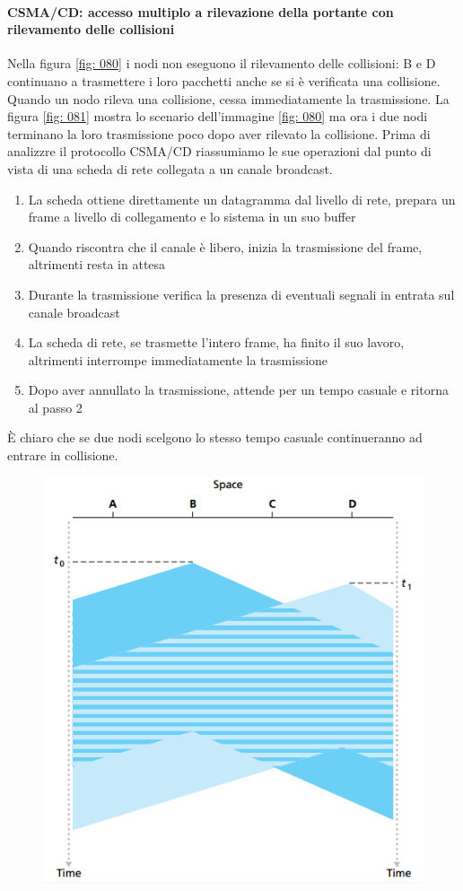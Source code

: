 \documentclass[11pt,a4paper]{article}
\begin{document}
{\paragraph{CSMA/CD: accesso multiplo a rilevazione della portante con rilevamento delle collisioni} \label{par: CSMA/CD}
Nella figura \ref{fig: 080} i nodi non eseguono il rilevamento delle collisioni: B e D continuano a trasmettere i loro pacchetti anche se si è verificata una collisione. Quando un nodo rileva una collisione, cessa immediatamente la trasmissione. La figura \ref{fig: 081} mostra lo scenario dell'immagine \ref{fig: 080} ma ora i due nodi terminano la loro trasmissione poco dopo aver rilevato la collisione. Prima di analizzre il protocollo CSMA/CD riassumiamo le sue operazioni dal punto di vista di una scheda di rete collegata a un canale broadcast.
\begin{enumerate}
	\item La scheda ottiene direttamente un datagramma dal livello di rete, prepara un frame a livello di collegamento e lo sistema in un suo buffer
	\item Quando riscontra che il canale è libero, inizia la trasmissione del frame, altrimenti resta in attesa
	\item Durante la trasmissione verifica la presenza di eventuali segnali in entrata sul canale broadcast
	\item La scheda di rete, se trasmette l'intero frame, ha finito il suo lavoro, altrimenti interrompe immediatamente la trasmissione
	\item Dopo aver annullato la trasmissione, attende per un tempo casuale e ritorna al passo 2
\end{enumerate}
È chiaro che se due nodi scelgono lo stesso tempo casuale continueranno ad entrare in collisione.
\begin{figure}
	\begin{center}
		\includegraphics[scale=0.6]{img/080.png}

\end{center}
\end{figure}}
\end{document}
